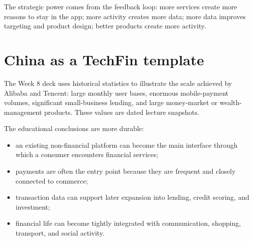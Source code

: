 \begin{mlfigure}
\end{mlfigure}

The strategic power comes from the feedback loop: more services create more reasons to stay in the app; more activity creates more data; more data improves targeting and product design; better products create more activity.

\section{China as a TechFin template}

The Week 8 deck uses historical statistics to illustrate the scale achieved by Alibaba and Tencent: large monthly user bases, enormous mobile-payment volumes, significant small-business lending, and large money-market or wealth-management products. These values are dated lecture snapshots.

The educational conclusions are more durable:

\begin{itemize}
  \item an existing non-financial platform can become the main interface through which a consumer encounters financial services;
  \item payments are often the entry point because they are frequent and closely connected to commerce;
  \item transaction data can support later expansion into lending, credit scoring, and investment;
  \item financial life can become tightly integrated with communication, shopping, transport, and social activity.
\end{itemize}

